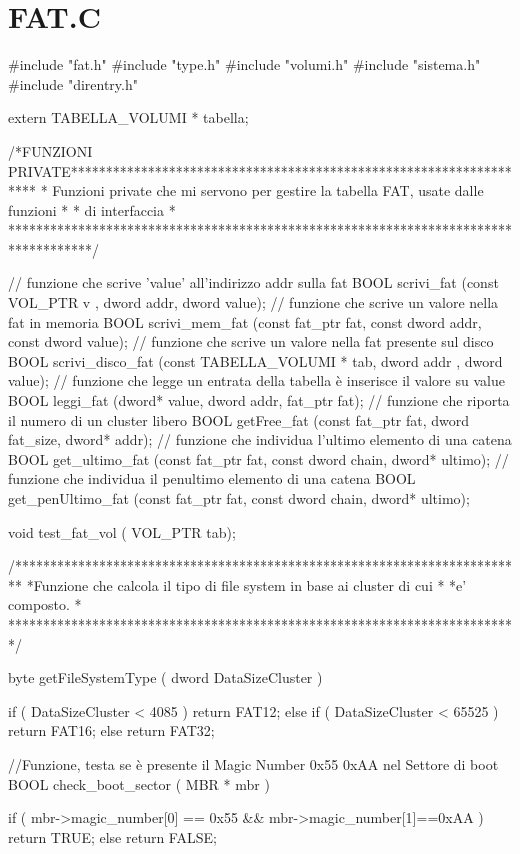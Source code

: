 
\chapter{FAT.C}

#include "fat.h"
#include "type.h"
#include "volumi.h"
#include "sistema.h"
#include "direntry.h" 



extern TABELLA_VOLUMI * tabella;



/*FUNZIONI PRIVATE*******************************************************************
 * Funzioni private che mi servono per gestire la tabella FAT, usate dalle funzioni *
 * di interfaccia								    *
 ************************************************************************************/

// funzione che scrive 'value' all'indirizzo addr sulla fat 
BOOL scrivi_fat  (const VOL_PTR v , dword addr, dword value);
// funzione che scrive un valore nella fat in memoria 
BOOL scrivi_mem_fat (const fat_ptr fat, const dword addr, const dword value);  
// funzione che scrive un valore nella fat presente sul disco 
BOOL scrivi_disco_fat (const TABELLA_VOLUMI * tab, dword addr , dword value);
// funzione che legge un entrata della tabella è inserisce il valore su value 
BOOL leggi_fat  (dword* value, dword addr, fat_ptr fat);
// funzione che riporta il numero di un cluster libero
BOOL getFree_fat  (const fat_ptr fat, dword fat_size, dword* addr);
// funzione che individua l'ultimo elemento di una catena 
BOOL get_ultimo_fat (const fat_ptr fat, const dword chain, dword* ultimo); 
// funzione che individua il penultimo elemento di una catena
BOOL get_penUltimo_fat (const fat_ptr fat, const dword chain, dword* ultimo); 


void test_fat_vol ( VOL_PTR tab);



/*************************************************************************
 *Funzione che calcola il tipo di file system in base ai cluster di cui  *
 *e' composto.								 *
 *************************************************************************/

byte getFileSystemType ( dword DataSizeCluster ) {

    if ( DataSizeCluster < 4085 )
        return FAT12;
    else if ( DataSizeCluster < 65525 )
        return FAT16;
    else
        return FAT32;
}


//Funzione, testa se è presente il Magic Number 0x55 0xAA nel Settore di boot 
BOOL check_boot_sector ( MBR * mbr ) {

    if ( mbr->magic_number[0] == 0x55 && mbr->magic_number[1]==0xAA )
        return TRUE;
    else
        return FALSE;
}


